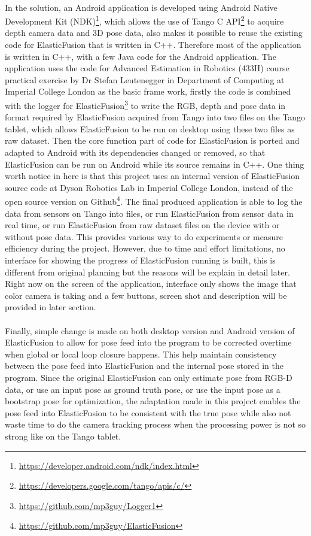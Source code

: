 \documentclass[12pt,twoside]{article}
\begin{document}
\\
In the solution, an Android application is developed using Android Native Development Kit (NDK)\footnote{\url{https://developer.android.com/ndk/index.html}}, which allows the use of Tango C API\footnote{\url{https://developers.google.com/tango/apis/c/}} to acquire depth camera data and 3D pose data, also makes it possible to reuse the existing code for ElasticFusion that is written in C++. Therefore most of the application is written in C++, with a few Java code for the Android application. The application uses the code for Advanced Estimation in Robotics (433H) course practical exercise by Dr Stefan Leutenegger in Department of Computing at Imperial College London as the basic frame work, firstly the code is combined with the logger for ElasticFusion\footnote{\url{https://github.com/mp3guy/Logger1}} to write the RGB, depth and pose data in format required by ElasticFusion acquired from Tango into two files on the Tango tablet, which allows ElasticFusion to be run on desktop using these two files as raw dataset. Then the core function part of code for ElasticFusion is ported and adapted to Android with its dependencies changed or removed, so that ElasticFusion can be run on Android while its source remains in C++. One thing worth notice in here is that this project uses an internal version of ElasticFusion source code at Dyson Robotics Lab in Imperial College London, instead of the open source version on Github\footnote{\url{https://github.com/mp3guy/ElasticFusion}}. The final produced application is able to log the data from sensors on Tango into files, or run ElasticFusion from sensor data in real time, or run ElasticFusion from raw dataset files on the device with or without pose data. This provides various way to do experiments or measure  efficiency during the project. However, due to time and effort limitations, no interface for showing the progress of ElasticFusion running is built, this is different from original planning but the reasons will be explain in detail later. Right now on the screen of the application, interface only shows the image that color camera is taking and a few buttons, screen shot and description will be provided in later section.\\
\\
Finally, simple change is made on both desktop version and Android version of ElasticFusion to allow for pose feed into the program to be corrected overtime when global or local loop closure happens. This help maintain consistency between the pose feed into ElasticFusion and the internal pose stored in the program. Since the original ElasticFusion can only estimate pose from RGB-D data, or use an input pose as ground truth pose, or use the input pose as a bootstrap pose for optimization, the adaptation made in this project enables the pose feed into ElasticFusion to be consistent with the true pose while also not waste time to do the camera tracking process when the processing power is not so strong like on the Tango tablet.
\end{document}
